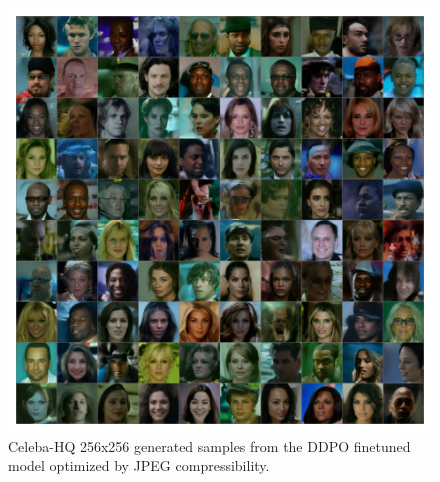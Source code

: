 \begin{appendixs}
        \begin{figure}
            \centering
            \includegraphics[scale=0.75]{img/results/ddpo-compressibility-samples.png}
            \vspace{-4pt}  %
            \captionsetup{width=\textwidth} %
            \caption{Celeba-HQ 256x256 generated samples from the DDPO finetuned model optimized by JPEG compressibility.}
            \label{fig:ddpo-compressibility-samples}
        \end{figure}


\end{appendixs}
